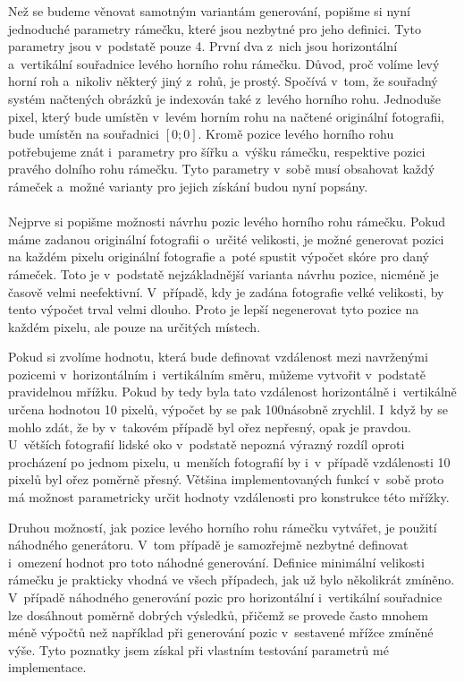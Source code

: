 Než se budeme věnovat samotným variantám generování, popišme si nyní jednoduché parametry rámečku, které jsou nezbytné pro jeho definici. Tyto parametry jsou v~podstatě pouze 4. První dva z~nich jsou horizontální a~vertikální souřadnice levého horního rohu rámečku. Důvod, proč volíme levý horní roh a~nikoliv některý jiný z~rohů, je prostý. Spočívá v~tom, že souřadný systém načtených obrázků je indexován také z~levého horního rohu. Jednoduše pixel, který bude umístěn v~levém horním rohu na načtené originální fotografii, bude umístěn na souřadnici $[0;0]$. Kromě pozice levého horního rohu potřebujeme znát i~parametry pro šířku a~výšku rámečku, respektive pozici pravého dolního rohu rámečku. Tyto parametry v~sobě musí obsahovat každý rámeček a~možné varianty pro jejich získání budou nyní popsány.

\paragraph{}
Nejprve si popišme možnosti návrhu pozic levého horního rohu rámečku. Pokud máme zadanou originální fotografii o~určité velikosti, je možné generovat pozici na každém pixelu originální fotografie a~poté spustit výpočet skóre pro daný rámeček. Toto je v~podstatě nejzákladnější varianta návrhu pozice, nicméně je časově velmi neefektivní. V~případě, kdy je zadána fotografie velké velikosti, by tento výpočet trval velmi dlouho. Proto je lepší negenerovat tyto pozice na každém pixelu, ale pouze na určitých místech.

Pokud si zvolíme hodnotu, která bude definovat vzdálenost mezi navrženými pozicemi v~horizontálním i~vertikálním směru, můžeme vytvořit v~podstatě pravidelnou mřížku. Pokud by tedy byla tato vzdálenost horizontálně i~vertikálně určena hodnotou 10 pixelů, výpočet by se pak 100násobně zrychlil. I~když by se mohlo zdát, že by v~takovém případě byl ořez nepřesný, opak je pravdou. U~větších fotografií lidské oko v~podstatě nepozná výrazný rozdíl oproti procházení po jednom pixelu, u~menších fotografií by i~v~případě vzdálenosti 10 pixelů byl ořez poměrně přesný. Většina implementovaných funkcí v~sobě proto má možnost parametricky určit hodnoty vzdálenosti pro konstrukce této mřížky.

Druhou možností, jak pozice levého horního rohu rámečku vytvářet, je použití náhodného generátoru. V~tom případě je samozřejmě nezbytné definovat i~omezení hodnot pro toto náhodné generování. Definice minimální velikosti rámečku je prakticky vhodná ve všech případech, jak už bylo několikrát zmíněno. V~případě náhodného generování pozic pro horizontální i~vertikální souřadnice lze dosáhnout poměrně dobrých výsledků, přičemž se provede často mnohem méně výpočtů než například při generování pozic v~sestavené mřížce zmíněné výše. Tyto poznatky jsem získal při vlastním testování parametrů mé implementace.

